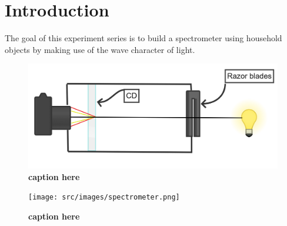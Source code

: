 \section{Introduction}

    The goal of this experiment series is to build a spectrometer using household objects by making use of the wave character of light.
    
    \begin{minipage}{0.99\linewidth}
        \begin{minipage}{0.5\linewidth}
            \begin{figure}[H]
                \centering
                \includegraphics[scale = 0.4]{src/images/experimental_setup.png}
                \caption{\textbf{caption here}}
                \label{fig_setup}
            \end{figure}
        \end{minipage}
        \begin{minipage}{0.5\linewidth}
          \begin{scriptsize}
            \begin{center}
                \begin{figure}[H]
                    \centering
                    \texttt{[image: src/images/spectrometer.png]}
                    \caption{\textbf{caption here}}
                    \label{fig_spectrometer}
                \end{figure}
            \end{center}
            \end{scriptsize}
        \end{minipage}
      \end{minipage}

